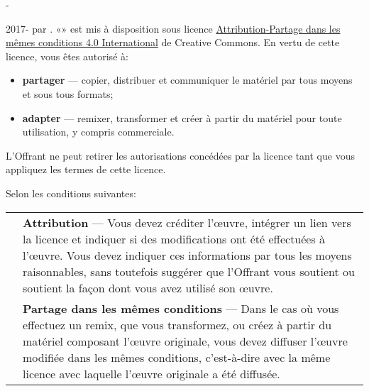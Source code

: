 
\begingroup
\calccentering{\unitlength}
\begin{adjustwidth*}{\unitlength}{-\unitlength}
  \setlength{\parindent}{0pt}
  \setlength{\parskip}{\baselineskip}
  \small

  {\smaller\ccbysa} 2017-{\year} par {\theauthor}. «\thetitle» est mis à
  disposition sous licence
  \href{https://creativecommons.org/licenses/by-sa/4.0/deed.fr}{%
    Attribution-Partage dans les mêmes conditions 4.0 International}
  de Creative Commons. En vertu de cette licence, vous êtes autorisé
  à:
  \begin{itemize}
  \item \textbf{partager} --- copier, distribuer et communiquer le
    matériel par tous moyens et sous tous formats;
  \item \textbf{adapter} --- remixer, transformer et créer à partir du
    matériel pour toute utilisation, y compris commerciale.
  \end{itemize}
  L'Offrant ne peut retirer les autorisations concédées par la licence
  tant que vous appliquez les termes de cette licence.

  Selon les conditions suivantes: \par
  \begin{tabularx}{\linewidth}{@{}lX@{}}
    \raisebox{-22pt}{\fontsize{32}{32}\selectfont\faCreativeCommonsBy}
    & \textbf{Attribution} --- Vous devez créditer l'œuvre, intégrer
      un lien vers la licence et indiquer si des modifications ont été
      effectuées à l'œuvre. Vous devez indiquer ces informations par
      tous les moyens raisonnables, sans toutefois suggérer que
      l'Offrant vous soutient ou soutient la façon dont vous avez utilisé
      son œuvre. \\
    \raisebox{-22pt}{\fontsize{32}{32}\selectfont\faCreativeCommonsSa}
    & \textbf{Partage dans les mêmes conditions} --- Dans le cas où vous
      effectuez un remix, que vous transformez, ou créez à partir du
      matériel composant l'œuvre originale, vous devez diffuser l'œuvre modifiée dans
      les mêmes conditions, c'est-à-dire avec la même licence avec laquelle
      l'œuvre originale a été diffusée.
  \end{tabularx}


\end{adjustwidth*}
